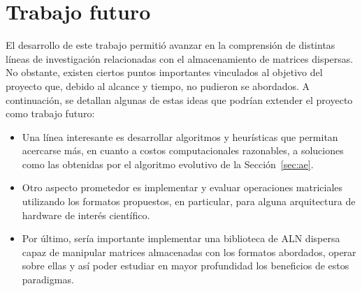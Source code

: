 \section{Trabajo futuro}
El desarrollo de este trabajo permitió avanzar en la comprensión de distintas líneas de investigación relacionadas con el almacenamiento de matrices dispersas.
No obstante, existen ciertos puntos importantes vinculados al objetivo del proyecto que, debido al alcance y tiempo, no pudieron se abordados.
A continuación, se detallan algunas de estas ideas que podrían extender el proyecto como trabajo futuro: 
\begin{itemize}
    \item Una línea interesante es desarrollar algoritmos y heurísticas que permitan acercarse más, en cuanto a costos computacionales razonables, a soluciones como las obtenidas por el algoritmo evolutivo de la Sección~\ref{sec:ae}.
    \item Otro aspecto prometedor es implementar y evaluar operaciones matriciales utilizando los formatos propuestos, en particular, para alguna arquitectura de hardware de interés científico.
    \item Por último, sería importante implementar una biblioteca de ALN dispersa capaz de manipular matrices almacenadas con los formatos abordados, operar sobre ellas y así poder estudiar en mayor profundidad los beneficios de estos paradigmas.
\end{itemize}
